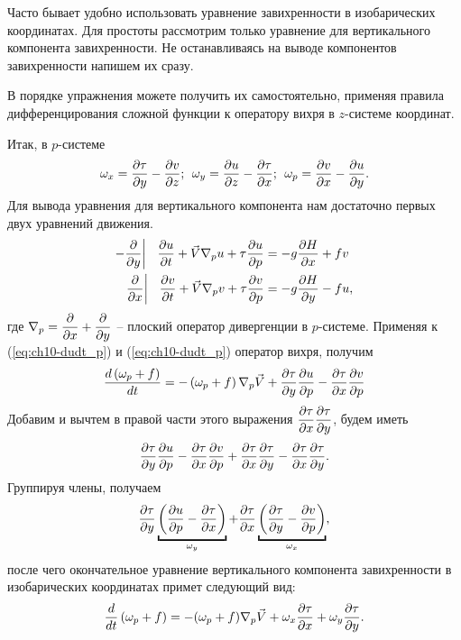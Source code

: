Часто бывает удобно использовать уравнение завихренности в изобарических координатах. Для простоты рассмотрим только уравнение для вертикального компонента завихренности. Не останавливаясь на выводе компонентов завихренности напишем их сразу. 
\begin{info}В порядке упражнения можете получить их самостоятельно, применяя правила дифференцирования сложной функции к оператору вихря в $z$-системе координат.\end{info}
Итак, в $p$-системе
\begin{equation}
    \omega_x = \pd{\tau}{y}-\pd{v}{z}; \:\: \omega_y = \pd{u}{z}-\pd{\tau}{x}; \:\:\omega_p = \pd{v}{x}-\pd{u}{y}.
\end{equation}
Для вывода уравнения для вертикального компонента нам достаточно первых двух уравнений движения.
\begin{align}
    -\pd{}{y} \bigg| \:\:\:\: \pd{u}{t}+\vec{V}\nabla_pu + \tau\pd{u}{p}&=-g\pd{H}{x}+fv \label{eq:ch10-dudt_p} \\
     \pd{}{x} \bigg| \:\:\:\: \pd{v}{t}+\vec{V}\nabla_pv + \tau\pd{v}{p}&=-g\pd{H}{y}-fu \label{eq:ch10-dudt_p},
\end{align}
где $\nabla_p=\pd{}{x}+\pd{}{y}$ -- плоский оператор дивергенции в $p$-системе. Применяя к (\ref{eq:ch10-dudt_p}) и (\ref{eq:ch10-dudt_p}) оператор вихря, получим
\begin{equation*}
    \td{ \left( \omega_p + f\right) }{t} = - \left( \omega_p+f \right)\nabla_p\vec{V}+\pd{\tau}{y}\pd{u}{p}-\pd{\tau}{x}\pd{v}{p}
\end{equation*}
Добавим и вычтем в правой части этого выражения $\pd{\tau}{x}\pd{\tau}{y}$, будем иметь
\begin{equation*}
    \pd{\tau}{y}\pd{u}{p} - \pd{\tau}{x}\pd{v}{p}+\pd{\tau}{x}\pd{\tau}{y}-\pd{\tau}{x}\pd{\tau}{y}.
\end{equation*}
Группируя члены, получаем
\begin{equation*}
    \pd{\tau}{y} 
    \ub{\left(  \pd{u}{p} - \pd{\tau}{x} \right)}_{\omega_y} + 
    \pd{\tau}{x} 
    \ub{\left( \pd{\tau}{y}-\pd{v}{p} \right)}_{\omega_x},
\end{equation*}
после чего окончательное уравнение вертикального компонента завихренности в изобарических координатах примет следующий вид: 
\begin{equation}
    \label{eq:ch10-DomegaDt_p}
    \td{}{t} \left( \omega_p + f \right) = -(\omega_p+f)\nabla_p\vec{V} + \omega_x\pd{\tau}{x}+\omega_y\pd{\tau}{y}.
\end{equation}
